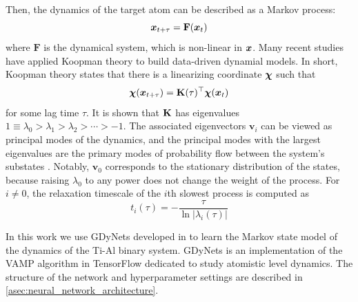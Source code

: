 Then, the dynamics of the target atom can be described as a Markov process:\cite{xie2019graph}
\begin{equation}
    \bm{x}_{t+\tau} = \mathbf{F}(\bm{x}_t)
\end{equation}
where $\mathbf{F}$ is the dynamical system, which is non-linear in $\bm{x}$. Many recent studies have applied Koopman theory to build data-driven dynamial models. In short, Koopman theory states that there is a linearizing coordinate $\bm{\chi}$ such that 
\begin{equation}
    \bm{\chi}(\bm{x}_{t+\tau}) = \mathbf{K}(\tau)^\top\bm{\chi}(\bm{x}_t)
\end{equation}
for some lag time $\tau$. It is shown that $\mathbf{K}$ has eigenvalues $1 \equiv \lambda_0 > \lambda_1 > \lambda_2 > \cdots > -1$.\cite{bowman2013introduction} The associated eigenvectors $\mathbf{v}_i$ can be viewed as principal modes of the dynamics, and the principal modes with the largest eigenvalues are the primary modes of probability flow between the system's substates \cite{bowman2013introduction}. Notably, $\mathbf{v}_0$ corresponds to the stationary distribution of the states, because raising $\lambda_0$ to any power does not change the weight of the process.\cite{prinz2011markov} For $i \neq 0$, the relaxation timescale of the $i$th slowest process is computed as
\begin{equation}
    t_i(\tau) = - \frac{\tau}{\ln \lvert \lambda_i(\tau) \rvert}
\end{equation}






In this work we use GDyNets developed in \cite{xie2019graph} to learn the Markov state model of the dynamics of the Ti-Al binary system. GDyNets is an implementation of the VAMP algorithm in TensorFlow dedicated to study atomistic level dynamics. The structure of the network and hyperparameter settings are described in \cref{asec:neural_network_architecture}.


